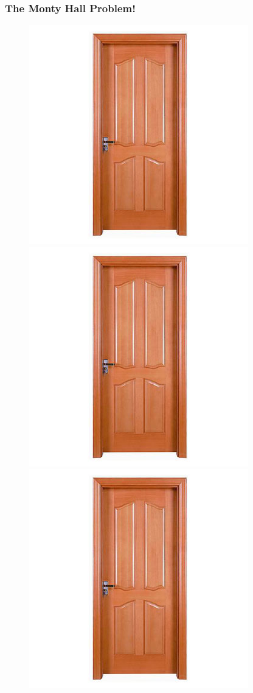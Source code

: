 \documentclass[handout]{beamer}
\begin{document}
\begin{frame}
\frametitle{The Monty Hall Problem!}
\begin{figure}
\includegraphics[scale = 0.28]{./images/door}
\includegraphics[scale = 0.28]{./images/door}
\includegraphics[scale = 0.28]{./images/door}

\end{figure}
\end{frame}
\end{document}
